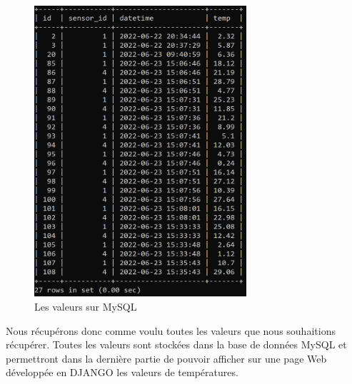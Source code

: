 \documentclass[12pt, a4paper]{article}
\begin{document}
		\begin{figure}[H]
			\centering
			\includegraphics[width=0.7\textwidth]{../img/datamysql.png}
			\caption{Les valeurs sur MySQL}
			\label{fig:vsql}
		\end{figure}

		Nous récupérons donc comme voulu toutes les valeurs que nous souhaitions récupérer. 
		Toutes les valeurs sont stockées dans la base de données MySQL et permettront dans la 
		dernière partie de pouvoir afficher sur une page Web développée en DJANGO les valeurs
		de températures. 
		
		
\end{document}
